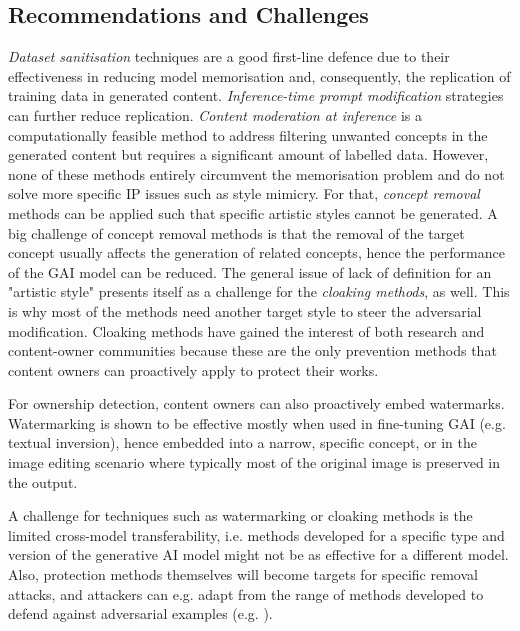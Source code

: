 \subsection{Recommendations and Challenges}\label{sec:conclusion:challenges}

\textit{Dataset sanitisation} techniques are a good first-line defence due to their effectiveness in reducing model memorisation and, consequently, the replication of training data in generated content. 
\textit{Inference-time prompt modification} strategies can further reduce replication. 
\textit{Content moderation at inference} is a computationally feasible method to address filtering unwanted concepts in the generated content but requires a significant amount of labelled data.
However, none of these methods entirely circumvent the memorisation problem and do not solve more specific IP issues such as style mimicry.
For that, \textit{concept removal} methods can be applied such that specific artistic styles cannot be generated.
A big challenge of concept removal methods is that the removal of the target concept usually affects the generation of related concepts, hence the performance of the GAI model can be reduced.
The general issue of lack of definition for an "artistic style" presents itself as a challenge for the \textit{cloaking methods}, as well. 
This is why most of the methods need another target style to steer the adversarial modification. 
Cloaking methods have gained the interest of both research and content-owner communities because these are the only prevention methods that content owners can proactively apply to protect their works. 

For ownership detection, content owners can also proactively embed watermarks. 
Watermarking is shown to be effective mostly when used in fine-tuning GAI (e.g. textual inversion), hence embedded into a narrow, specific concept, or in the image editing scenario where typically most of the original image is preserved in the output. 

A challenge for techniques such as watermarking or cloaking methods is the limited cross-model transferability, i.e. methods developed for a specific type and version of the generative AI model might not be as effective for a different model. Also, protection methods themselves will become targets for specific removal attacks, and attackers can e.g. adapt from the range of methods developed to defend against adversarial examples (e.g. \cite{meng_magnet_2017}).

